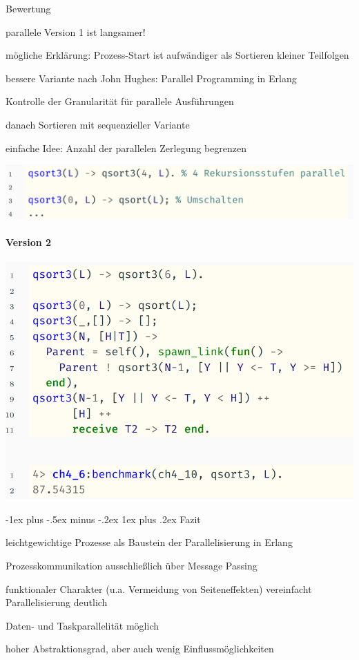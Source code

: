 \documentclass[10pt]{article}
\makeatletter
\renewcommand{\subsubsection}{\@startsection{subsubsection}{3}{0mm}%
                                {-1ex plus -.5ex minus -.2ex}%
                                {1ex plus .2ex}%
                                {\normalfont\small\bfseries}}
\makeatother
\begin{document}
Bewertung
\begin{itemize*}
  \item parallele Version 1 ist langsamer!
  \item mögliche Erklärung: Prozess-Start ist aufwändiger als Sortieren kleiner Teilfolgen
  \item bessere Variante nach John Hughes: Parallel Programming in Erlang
  \begin{itemize*}
    \item Kontrolle der Granularität für parallele Ausführungen
    \item danach Sortieren mit sequenzieller Variante
    \item einfache Idee: Anzahl der parallelen Zerlegung begrenzen
  \end{itemize*}
\end{itemize*}
\begin{center}
  \includegraphics[width=0.4\linewidth]{Assets/Programmierparadigmen-code-snippet-14}
\end{center}

\paragraph{Version 2}

\begin{center}
  \includegraphics[width=0.4\linewidth]{Assets/Programmierparadigmen-code-snippet-15}
\end{center}

\subsubsection{Fazit}
\begin{itemize*}
  \item \color{orange} leichtgewichtige Prozesse \color{black} als Baustein der Parallelisierung in Erlang
  \item Prozesskommunikation ausschließlich über \color{orange} Message Passing \color{black}
  \item \color{orange} funktionaler Charakter \color{black} (u.a. Vermeidung von Seiteneffekten) vereinfacht Parallelisierung deutlich
  \item \color{orange} Daten- und Taskparallelität \color{black} möglich
  \item hoher Abstraktionsgrad, aber auch wenig Einflussmöglichkeiten
\end{itemize*}
\end{document}
